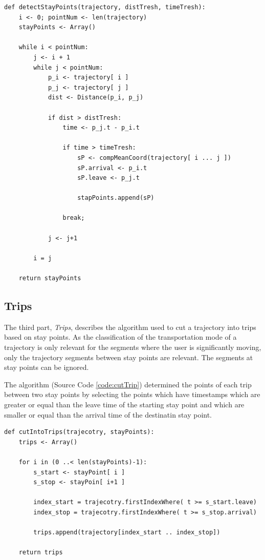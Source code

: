 \begin{lstlisting}[style=py, caption={Pseudocode: Stay Point Detection \cite{li2008mining}}, label={code:stayPoint}]
def detectStayPoints(trajectory, distTresh, timeTresh):
    i <- 0; pointNum <- len(trajectory)
    stayPoints <- Array()
    
    while i < pointNum:
        j <- i + 1
        while j < pointNum:
            p_i <- trajectory[ i ]
            p_j <- trajectory[ j ]
            dist <- Distance(p_i, p_j)
            
            if dist > distTresh:
                time <- p_j.t - p_i.t
                
                if time > timeTresh:
                    sP <- compMeanCoord(trajectory[ i ... j ])
                    sP.arrival <- p_i.t
                    sP.leave <- p_j.t
                    
                    stapPoints.append(sP)
                
                break;
            
            j <- j+1
        
        i = j
    
    return stayPoints
\end{lstlisting}


\subsection{Trips}
The third part, \textit{Trips}, describes the algorithm used to cut a trajectory into trips based on stay points. As the classification of the transportation mode of a trajectory is only relevant for the segments where the user is significantly moving, only the trajectory segments between stay points are relevant. The segments at stay points can be ignored.

The algorithm (Source Code \ref{code:cutTrip}) determined the points of each trip between two stay points by selecting the points which have timestamps which are greater or equal than the leave time of the starting stay point and which are smaller or equal than the arrival time of the destinatin stay point. 

\begin{lstlisting}[style=py, caption={Pseudocode: Determine Trips in Trjajectory}, label={code:cutTrip}]
def cutIntoTrips(trajecotry, stayPoints):
    trips <- Array()
    
    for i in (0 ..< len(stayPoints)-1):
        s_start <- stayPoint[ i ]
        s_stop <- stayPoin[ i+1 ]
        
        index_start = trajecotry.firstIndexWhere( t >= s_start.leave)
        index_stop = trajecotry.firstIndexWhere( t >= s_stop.arrival)
        
        trips.append(trajectory[index_start .. index_stop])
    
    return trips
\end{lstlisting}


